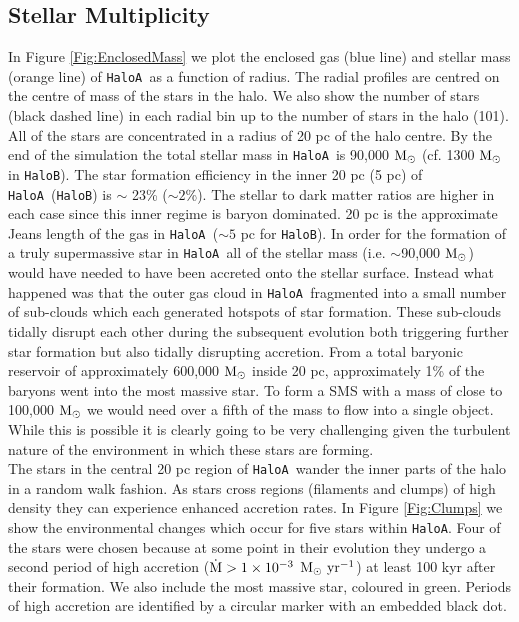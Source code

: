 \documentclass[twocolumn,iop,revtex4]{openjournal}
\newcommand{\msolar} {$\rm{M_{\odot}}~$}
\newcommand{\msolarc} {$\rm{M_{\odot}}$}
\newcommand{\msolaryrc} {$\rm{M_{\odot}~yr^{-1}}$}
\newcommand{\ha} {\texttt{HaloA~}}
\newcommand{\hac} {\texttt{HaloA}}
\newcommand{\hbc} {\texttt{HaloB}}
\begin{document}
\subsection{Stellar Multiplicity}
\noindent In Figure \ref{Fig:EnclosedMass} we plot the enclosed gas (blue line) and
  stellar mass (orange line) of \ha as a function of radius.
The radial profiles are centred on the centre of mass of the stars in the halo. We also show the
number of stars (black dashed line) in each radial bin up to the number of stars in the halo (101). All of the stars
are concentrated in a radius of 20 pc of the halo centre. By the end of the simulation the total stellar mass
in \ha is 90,000 \msolar (cf. 1300
\msolar in \hbc). The star formation efficiency in the inner 20 pc (5 pc) of \ha (\hbc) is $\sim$ 23\%
($\sim 2$\%). The stellar to dark matter ratios are higher in each case since this 
inner regime is baryon dominated. 20 pc is the approximate Jeans length of the gas in \ha ($\sim 5$ pc for \hbc).
In order for the formation of a truly supermassive star in \ha all of the
stellar mass
(i.e. $\sim$90,000 \msolarc) would have needed to have been accreted onto the stellar surface. Instead
what happened was that the outer gas cloud in \ha fragmented into a small number of sub-clouds which
each generated hotspots of star formation. These sub-clouds tidally disrupt each other during the
subsequent evolution both triggering further star formation but also tidally disrupting accretion.
From a total baryonic reservoir of approximately 600,000 \msolar inside 20 pc, approximately 1\% of the baryons went
into the most massive star. To form a SMS
with a mass of close to 100,000 \msolar we would need over a fifth of the mass to 
flow into a single object. While this is possible it is clearly going to be 
very challenging given the turbulent nature of the environment in which these stars are forming. \\
\indent The stars in the central 20 pc region of \ha wander the inner parts of the halo in a random walk fashion. As
stars cross regions (filaments and clumps) of high density they can experience enhanced accretion rates. In Figure
\ref{Fig:Clumps} we show the environmental changes which occur for five stars within \hac. Four of the stars were
chosen because at some point in their evolution they undergo a second period of high accretion
($\dot{\rm{M}} > 1 \times 10^{-3}$ \msolaryrc) at least 100 kyr after their formation. We also include the
most massive star, coloured in green. Periods of high accretion 
are identified by a circular marker with an embedded black dot. 
\end{document}
